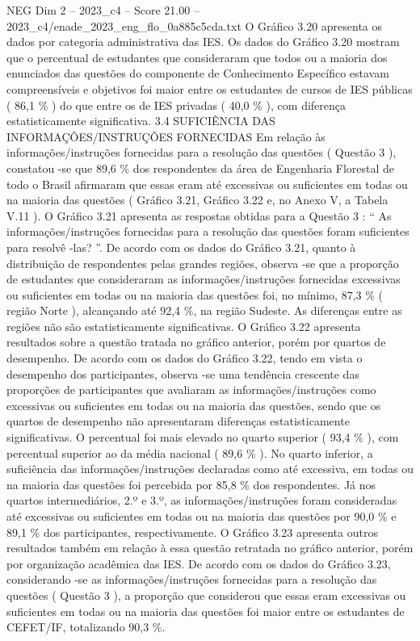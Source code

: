 \begin{textsample}{NEG Dim 2 – 2023\_c4 – Score 21.00 – 2023\_c4/enade\_2023\_eng\_flo\_0a885c5cda.txt}
O Gráfico 3.20 apresenta os dados por categoria administrativa das IES.
Os dados do Gráfico 3.20 mostram que o percentual de estudantes que consideraram que todos ou a maioria dos enunciados das questões do componente de Conhecimento Específico estavam compreensíveis e objetivos foi maior entre os estudantes de cursos de IES públicas ( 86,1 \% ) do que entre os de IES privadas ( 40,0 \% ), com diferença estatisticamente significativa. 3.4 SUFICIÊNCIA DAS INFORMAÇÕES/INSTRUÇÕES FORNECIDAS Em relação às informações/instruções fornecidas para a resolução das questões ( Questão 3 ), constatou -se que 89,6 \% dos respondentes da área de Engenharia Florestal de todo o Brasil afirmaram que essas eram até excessivas ou suficientes em todas ou na maioria das questões ( Gráfico 3.21, Gráfico 3.22 e, no Anexo V, a Tabela V.11 ).
O Gráfico 3.21 apresenta as respostas obtidas para a Questão 3 : “ As informações/instruções fornecidas para a resolução das questões foram suficientes para resolvê -las? ”.
De acordo com os dados do Gráfico 3.21, quanto à distribuição de respondentes pelas grandes regiões, observa -se que a proporção de estudantes que consideraram as informações/instruções fornecidas excessivas ou suficientes em todas ou na maioria das questões foi, no mínimo, 87,3 \% ( região Norte ), alcançando até 92,4 \%, na região Sudeste.
As diferenças entre as regiões não são estatisticamente significativas.
O Gráfico 3.22 apresenta resultados sobre a questão tratada no gráfico anterior, porém por quartos de desempenho.
De acordo com os dados do Gráfico 3.22, tendo em vista o desempenho dos participantes, observa -se uma tendência crescente das proporções de participantes que avaliaram as informações/instruções como excessivas ou suficientes em todas ou na maioria das questões, sendo que os quartos de desempenho não apresentaram diferenças estatisticamente significativas.
O percentual foi mais elevado no quarto superior ( 93,4 \% ), com percentual superior ao da média nacional ( 89,6 \% ).
No quarto inferior, a suficiência das informações/instruções declaradas como até excessiva, em todas ou na maioria das questões foi percebida por 85,8 \% dos respondentes.
Já nos quartos intermediários, 2.º e 3.º, as informações/instruções foram consideradas até excessivas ou suficientes em todas ou na maioria das questões por 90,0 \% e 89,1 \% dos participantes, respectivamente.
O Gráfico 3.23 apresenta outros resultados também em relação à essa questão retratada no gráfico anterior, porém por organização acadêmica das IES.
De acordo com os dados do Gráfico 3.23, considerando -se as informações/instruções fornecidas para a resolução das questões ( Questão 3 ), a proporção que considerou que essas eram excessivas ou suficientes em todas ou na maioria das questões foi maior entre os estudantes de CEFET/IF, totalizando 90,3 \%.

\end{textsample}
